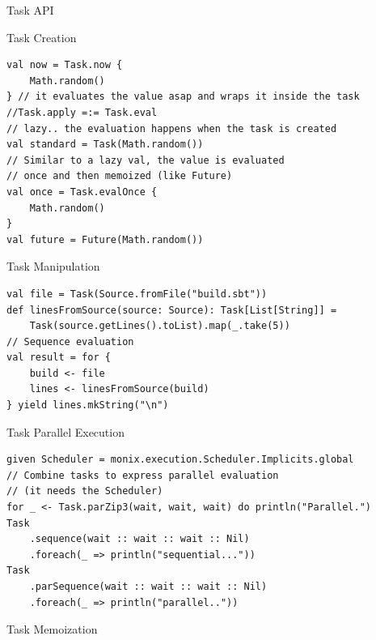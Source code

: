 \documentclass[presentation, 9pt]{beamer}\mode<presentation>{\usetheme{AMSBolognaFC}}
\begin{document}
\begin{frame}{Task API}
	\begin{alertblock}{Task Creation}
		\begin{tcolorbox}[left=0pt, top=0pt, bottom=0pt]
					 \begin{verbatim}
val now = Task.now {
	Math.random()
} // it evaluates the value asap and wraps it inside the task
//Task.apply =:= Task.eval
// lazy.. the evaluation happens when the task is created
val standard = Task(Math.random())
// Similar to a lazy val, the value is evaluated 
// once and then memoized (like Future)
val once = Task.evalOnce {
	Math.random()
}
val future = Future(Math.random())
					 \end{verbatim}
				 \end{tcolorbox}
		 \end{alertblock}
		 \begin{alertblock}{Task Manipulation}
			\begin{tcolorbox}[left=0pt, top=0pt, bottom=0pt]
						 \begin{verbatim}
val file = Task(Source.fromFile("build.sbt"))
def linesFromSource(source: Source): Task[List[String]] = 
	Task(source.getLines().toList).map(_.take(5))
// Sequence evaluation
val result = for {
	build <- file
	lines <- linesFromSource(build)
} yield lines.mkString("\n")
						 \end{verbatim}
					 \end{tcolorbox}
			 \end{alertblock}
			 \begin{alertblock}{Task Parallel Execution}
				\begin{tcolorbox}[left=0pt, top=0pt, bottom=0pt]
							 \begin{verbatim}
given Scheduler = monix.execution.Scheduler.Implicits.global
// Combine tasks to express parallel evaluation
// (it needs the Scheduler)
for _ <- Task.parZip3(wait, wait, wait) do println("Parallel.")
Task
	.sequence(wait :: wait :: wait :: Nil)
	.foreach(_ => println("sequential..."))
Task
	.parSequence(wait :: wait :: wait :: Nil)
	.foreach(_ => println("parallel.."))
							 \end{verbatim}
						 \end{tcolorbox}
				 \end{alertblock}
				 \begin{alertblock}{Task Memoization}
					\begin{tcolorbox}[left=0pt, top=0pt, bottom=0pt]
								 \begin{verbatim}

\end{verbatim}
\end{tcolorbox}
\end{alertblock}
\end{frame}
\end{document}
